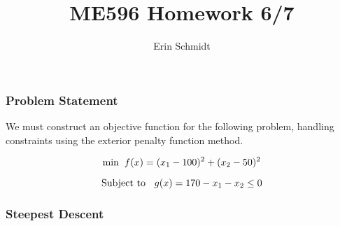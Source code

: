 \documentclass{article}
\title{ME596 Homework 6/7}
\author{Erin Schmidt}
\date{}
\begin{document}
    
    
    \maketitle
    
    

    
    \subsubsection*{Problem Statement}\label{problem-statement}

We must construct an objective function for the following problem,
handling constraints using the exterior penalty function method.

\[\mbox{min} \hspace{2 mm} f(x) = (x_1 -100)^2 + (x_2 -50)^2\]

\[\mbox{Subject to } \hspace{2 mm} g(x) = 170 -x_1 -x_2 \leq 0\]

    \subsubsection*{Steepest Descent}\label{steepest-descent}
\end{document}
